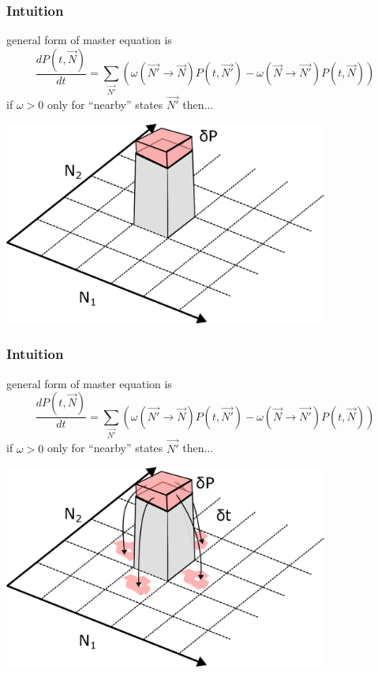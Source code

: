 \documentclass{beamer}
\begin{document}
\begin{frame}
    \frametitle{Intuition}
    general form of master equation is
    \begin{equation}
        \frac{dP(t, \vec{N})}{dt} = \sum_{\vec{N'}} \left(
        \omega(\vec{N'} \rightarrow \vec{N}) P(t, \vec{N'})
        - \omega(\vec{N} \rightarrow \vec{N'}) P(t, \vec{N})
        \right)
    \end{equation}
    if $\omega > 0$ only for ``nearby'' states $\vec{N'}$ then...

    \includegraphics[width=0.8\textwidth]{figures/intuition2}
\end{frame}

\begin{frame}
    \frametitle{Intuition}
    general form of master equation is
    \begin{equation}
        \frac{dP(t, \vec{N})}{dt} = \sum_{\vec{N'}} \left(
        \omega(\vec{N'} \rightarrow \vec{N}) P(t, \vec{N'})
        - \omega(\vec{N} \rightarrow \vec{N'}) P(t, \vec{N})
        \right)
    \end{equation}
    if $\omega > 0$ only for ``nearby'' states $\vec{N'}$ then...

    \includegraphics[width=0.8\textwidth]{figures/intuition3}
\end{frame}
\end{document}
